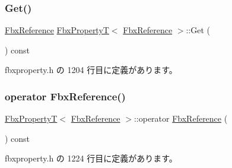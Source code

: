 \subsubsection{\texorpdfstring{Get()}{Get()}}
{\footnotesize\ttfamily \hyperlink{fbxtypes_8h_a44df6a2eec915cf27cd481e5c5e48a24}{Fbx\+Reference} \hyperlink{class_fbx_property_t}{Fbx\+PropertyT}$<$ \hyperlink{fbxtypes_8h_a44df6a2eec915cf27cd481e5c5e48a24}{Fbx\+Reference} $>$\+::Get (\begin{DoxyParamCaption}{ }\end{DoxyParamCaption}) const\hspace{0.3cm}{\ttfamily [inline]}}



 fbxproperty.\+h の 1204 行目に定義があります。

\mbox{\label{class_fbx_property_t_3_01_fbx_reference_01_4_a5c5065932e01bfc6bffb87e6aad34ddf}} 
\subsubsection{\texorpdfstring{operator Fbx\+Reference()}{operator FbxReference()}}
{\footnotesize\ttfamily \hyperlink{class_fbx_property_t}{Fbx\+PropertyT}$<$ \hyperlink{fbxtypes_8h_a44df6a2eec915cf27cd481e5c5e48a24}{Fbx\+Reference} $>$\+::operator \hyperlink{fbxtypes_8h_a44df6a2eec915cf27cd481e5c5e48a24}{Fbx\+Reference} (\begin{DoxyParamCaption}{ }\end{DoxyParamCaption}) const\hspace{0.3cm}{\ttfamily [inline]}}



 fbxproperty.\+h の 1224 行目に定義があります。

\mbox{\label{class_fbx_property_t_3_01_fbx_reference_01_4_a84a5262ef5dc13b09eb598d554949ce7}} 
